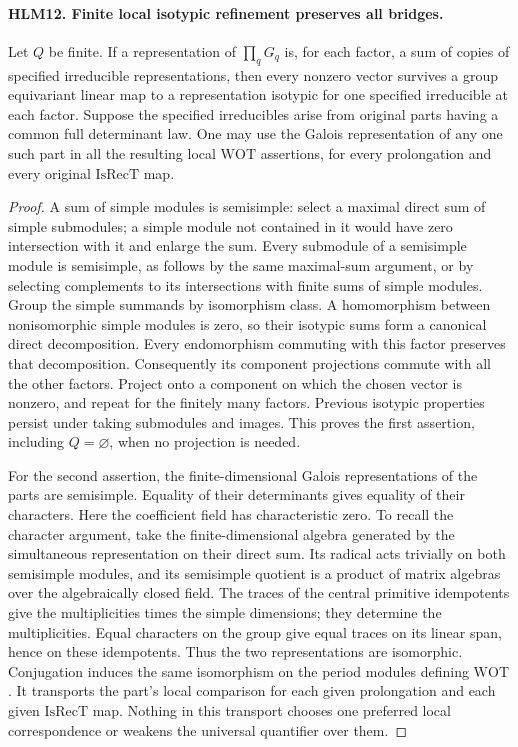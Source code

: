 \paragraph{HLM12. Finite local isotypic refinement preserves all bridges.}
\label{claim:HLM12}
Let \(Q\) be finite.  If a representation of \(\prod_qG_q\)
is, for each factor, a sum of copies of specified irreducible
representations, then every nonzero vector survives a group
equivariant linear map to a representation isotypic for one
specified irreducible at each factor.  Suppose the specified
irreducibles arise from original parts having a common full
determinant law.  One may use the Galois representation of any
one such part in all the resulting local \(\mathrm{WOT}\)
assertions, for every prolongation and every original
\(\mathrm{IsRecT}\) map.
\begin{proof}
A sum of simple modules is semisimple: select a maximal direct
sum of simple submodules; a simple module not contained in it
would have zero intersection with it and enlarge the sum.
Every submodule of a semisimple module is semisimple, as follows
by the same maximal-sum argument, or by selecting complements
to its intersections with finite sums of simple modules.
Group the simple summands by isomorphism class.  A homomorphism
between nonisomorphic simple modules is zero, so their
isotypic sums form a canonical direct decomposition.  Every
endomorphism commuting with this factor preserves that
decomposition.  Consequently its component projections commute
with all the other factors.  Project onto a component on which
the chosen vector is nonzero, and repeat for the finitely many
factors.  Previous isotypic properties persist under taking
submodules and images.  This proves the first assertion,
including \(Q=\varnothing\), when no projection is needed.

For the second assertion, the finite-dimensional Galois
representations of the parts are semisimple.  Equality of their
determinants gives equality of their characters.  Here the
coefficient field has characteristic zero.  To recall the
character argument, take the finite-dimensional algebra generated
by the simultaneous representation on their direct sum.
Its radical acts trivially on both semisimple modules, and its
semisimple quotient is a product of matrix algebras over the
algebraically closed field.  The traces of the central primitive
idempotents give the multiplicities times the simple dimensions;
they determine the multiplicities.  Equal characters on the
group give equal traces on its linear span, hence on these
idempotents.  Thus the two representations are isomorphic.
Conjugation induces the same isomorphism on the period modules
defining \(\mathrm{WOT}\).  It transports the part's local
comparison for each given prolongation and each given
\(\mathrm{IsRecT}\) map.  Nothing in this transport chooses
one preferred local correspondence or weakens the universal
quantifier over them.
\end{proof}

